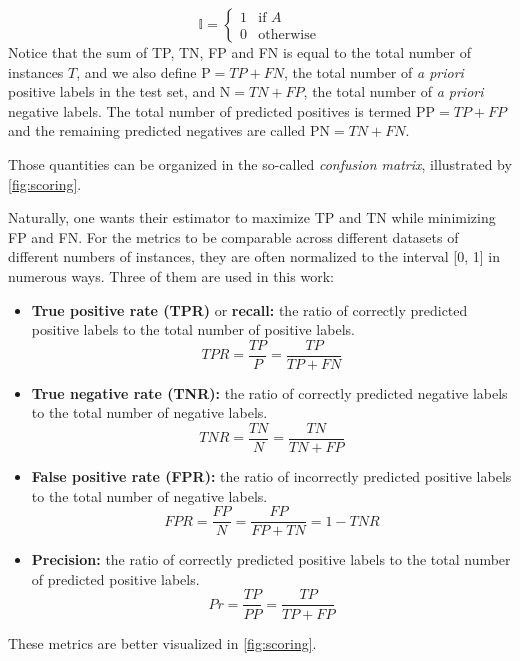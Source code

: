 %
\begin{equation}
    \mathbb{I} = \begin{cases}
        1 & \text{if } A\\
        0 & \text{otherwise}
    \end{cases}
    \label{eq:indicator}
\end{equation}
%
Notice that the sum of TP, TN, FP and FN is equal to the total number of instances $T$, and we also define $\text{P}=TP+FN$, the total number of \textit{a priori} positive labels in the test set, and $\text{N}=TN+FP$, the total number of \textit{a priori} negative labels. The total number of predicted positives is termed $\text{PP}=TP+FP$ and the remaining predicted negatives are called $\text{PN}=TN+FN$.%


Those quantities can be organized in the so-called \emph{confusion matrix}, illustrated by \autoref{fig:scoring}.

Naturally, one wants their estimator to maximize TP and TN while minimizing FP and FN. For the metrics to be comparable across different datasets of different numbers of instances, they are often normalized to the interval [0, 1] in numerous ways. Three of them are used in this work: 
%
\begin{itemize}
    \item \textbf{True positive rate (TPR)} or \textbf{recall:} the ratio of correctly predicted positive labels to the total number of positive labels.
    \begin{equation}
        TPR = \frac{TP}{P} = \frac{TP}{TP + FN}
        \label{eq:tpr}
    \end{equation}
    \item \textbf{True negative rate (TNR):} the ratio of correctly predicted negative labels to the total number of negative labels.
    \begin{equation}
        TNR = \frac{TN}{N} = \frac{TN}{TN + FP}
        \label{eq:tnr}
    \end{equation}
    \item \textbf{False positive rate (FPR):} the ratio of incorrectly predicted positive labels to the total number of negative labels.
    \begin{equation}
        FPR = \frac{FP}{N} = \frac{FP}{FP + TN} = 1-TNR 
        \label{eq:fpr}
    \end{equation}
    \item \textbf{Precision:} the ratio of correctly predicted positive labels to the total number of predicted positive labels.
    \begin{equation}
        Pr = \frac{TP}{PP} = \frac{TP}{TP + FP}
    \end{equation}
\end{itemize}
These metrics are better visualized in \autoref{fig:scoring}.

